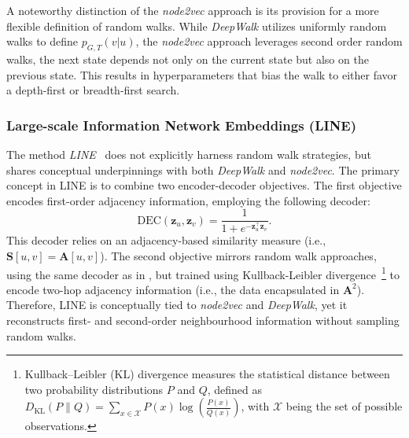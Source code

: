 A noteworthy distinction of the \textit{node2vec} approach is its provision for a more flexible definition of random walks. While \textit{DeepWalk} utilizes uniformly random walks to define $ p_{G,T}(v|u) $, the \textit{node2vec} approach leverages second order random walks, the next state depends not only on the current state but also on the previous state. This results in hyperparameters that bias the walk to either favor a depth-first or breadth-first search.

\subsubsection{Large-scale Information Network Embeddings (LINE)}
The method \textit{LINE}~\cite{Tang2015line} does not explicitly harness random walk strategies, but shares conceptual underpinnings with both \textit{DeepWalk} and \textit{node2vec}. The primary concept in LINE is to combine two encoder-decoder objectives. The first objective encodes first-order adjacency information, employing the following decoder:
\begin{equation*}
    \text{DEC}(\mathbf{z}_u, \mathbf{z}_v) = \frac{1}{1 + e^{-\mathbf{z}_u^\top\mathbf{z}_v}}.
\end{equation*}
This decoder relies on an adjacency-based similarity measure (i.e., $ \textbf{S}[u,v] = \mathbf{A}[u,v] $). The second objective mirrors random walk approaches, using the same decoder as in , but trained using Kullback-Leibler divergence~\footnote{Kullback–Leibler (KL) divergence measures the statistical distance between two probability distributions $P$ and $Q$, defined as $ D_{\text{KL}}(P\parallel Q)=\sum_{x\in \mathcal{X}}P(x)\log \left(\frac{P(x)}{Q(x)}\right) $, with $\mathcal{X}$ being the set of possible observations.} to encode two-hop adjacency information (i.e., the data encapsulated in $ \mathbf{A}^2 $). Therefore, LINE is conceptually tied to \textit{node2vec} and \textit{DeepWalk}, yet it reconstructs first- and second-order neighbourhood information without sampling random walks.

